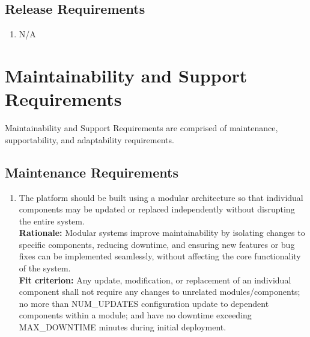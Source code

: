 \documentclass[12pt]{article}
\begin{document}
\subsection{Release Requirements}
\begin{enumerate}[label={OE-RR\arabic*}. ]
  \item N/A
\end{enumerate}

\newpage

\section{Maintainability and Support Requirements}
\hspace{2em}Maintainability and Support Requirements are comprised of maintenance, supportability, and adaptability requirements.
\subsection{Maintenance Requirements}
\begin{enumerate}[label={MS-MR}1. ]
  \item The platform should be built using a modular architecture so that individual components may be updated or replaced independently without disrupting the entire system.\\
  \textbf{Rationale: }Modular systems improve maintainability by isolating changes to specific components, reducing downtime, and ensuring new features or bug fixes can be implemented seamlessly, without affecting the core functionality of the system.\\
  \textbf{Fit criterion: }Any update, modification, or replacement of an individual component shall not require any changes to unrelated modules/components; no more than NUM\_UPDATES configuration update to dependent components within a module; and have no downtime exceeding MAX\_DOWNTIME minutes during initial deployment.
\end{enumerate}
\end{document}
